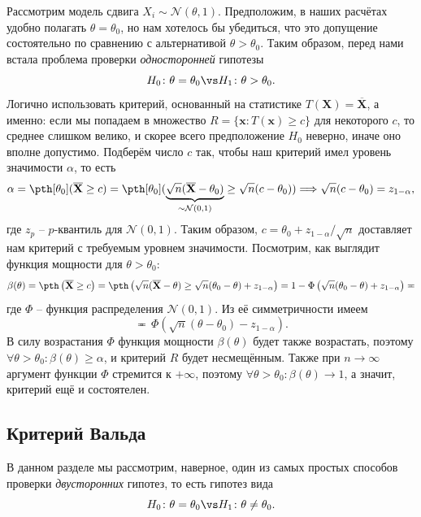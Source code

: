 \begin{example}
Рассмотрим модель сдвига $X_i \sim \mathcal{N}(\theta, 1)$. Предположим, в наших расчётах удобно полагать $\theta = \theta_0$, но нам хотелось бы убедиться, что это допущение состоятельно по сравнению с альтернативой $\theta > \theta_0$. Таким образом, перед нами встала проблема проверки \textit{односторонней} гипотезы
\[
H_0 \colon \theta = \theta_0 \vs H_1\colon \theta > \theta_0.
\]
Логично использовать критерий, основанный на статистике $T(\mathbf X) = \overline{\mathbf X}$, а именно: если мы попадаем в множество $R=\{\mathbf{x}\colon T(\mathbf{x}) \ge c\}$ для некоторого $c$, то среднее слишком велико, и скорее всего предположение $H_0$ неверно, иначе оно вполне допустимо. Подберём число $c$ так, чтобы наш критерий имел уровень значимости $\alpha$, то есть
\[
\alpha = \pth[\theta_0](\overline{\mathbf X} \ge c) = \pth[\theta_0](\underbrace{\sqrt{n}(\overline{\mathbf X} - \theta_0)}_{\sim \mathcal{N}(0, 1)} \ge \sqrt{n}(c - \theta_0)) \Longrightarrow \sqrt{n}(c - \theta_0) = z_{1-\alpha},
\]
где $z_p$ -- $p$-квантиль для $\mathcal{N}(0, 1)$. Таким образом, $c = \theta_0 + z_{1-\alpha}/\sqrt{n}$ доставляет нам критерий с требуемым уровнем значимости. Посмотрим, как выглядит функция мощности для $\theta > \theta_0$:
\[
\beta(\theta) = \pth\left(\overline{\mathbf X} \ge c\right) = \pth\left(\sqrt{n}(\overline{\mathbf X} - \theta) \ge \sqrt{n}(\theta_0 - \theta) + z_{1-\alpha}\right) = 1 - \Phi\left(\sqrt{n}(\theta_0 - \theta) + z
_{1-\alpha}\right) \eqcirc
\]
где $\Phi$ -- функция распределения $\mathcal{N}(0, 1)$. Из её симметричности имеем
\[
\eqcirc \,\Phi\left(\sqrt{n}(\theta - \theta_0) - z_{1-\alpha}\right).
\]
В силу возрастания $\Phi$ функция мощности $\beta(\theta)$ будет также возрастать, поэтому $\forall \theta > \theta_0\colon \beta(\theta) \ge \alpha$, и критерий $R$ будет несмещённым. Также при $n \to \infty$ аргумент функции $\Phi$ стремится к $+\infty$, поэтому $\forall \theta > \theta_0\colon \beta(\theta) \to 1$, а значит, критерий ещё и состоятелен.
\end{example}

\subsection{Критерий Вальда}\label{wald_test}

В данном разделе мы рассмотрим, наверное, один из самых простых способов проверки \textit{двусторонних} гипотез, то есть гипотез вида
\[
H_0\colon \theta = \theta_0 \vs H_1\colon \theta \ne \theta_0.
\]

